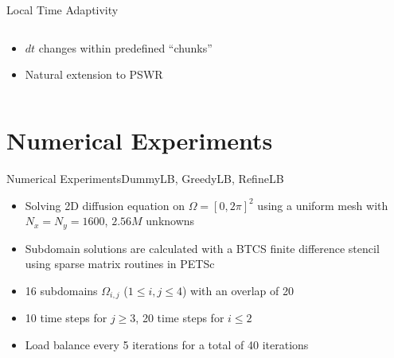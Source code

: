 \documentclass[]{beamer}
\begin{document}
\begin{frame}{Local Time Adaptivity}

  \begin{columns}

    \begin{column}{.4\textwidth}

      \begin{itemize}
      \item $dt$ changes within predefined ``chunks''
      \item Natural extension to PSWR
      \end{itemize}
      
    \end{column}

    \begin{column}{.6\textwidth}

      \begin{figure}
        \centering
      \end{figure}

    \end{column}
  \end{columns}

\end{frame}

\section{Numerical Experiments}

\begin{frame}{Numerical Experiments}{DummyLB, GreedyLB, RefineLB}
  
  \begin{itemize}
  \item Solving 2D diffusion equation on $\Omega = [0,2\pi]^2$ using a
    uniform mesh with $N_x = N_y = 1600$, $2.56M$ unknowns
  \item Subdomain solutions are calculated with a BTCS finite
    difference stencil using sparse matrix routines in PETSc
  \item 16 subdomains $\Omega_{i,j}$ ($1\leq i,j \leq 4$) with an
    overlap of 20
  \item 10 time steps for $j\geq3$, 20 time steps for $i\leq2$
  \item Load balance every 5 iterations for a total of 40 iterations
  \end{itemize}
\end{frame}
\end{document}
